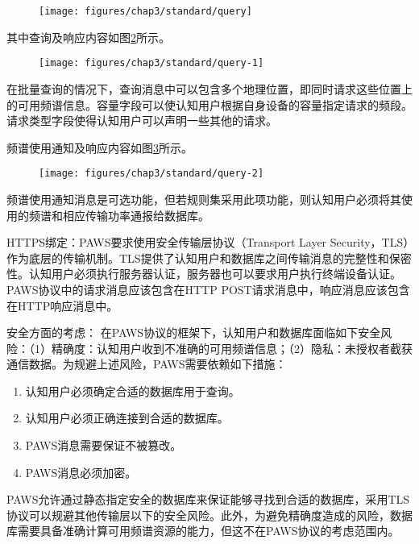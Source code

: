 \begin{enumerate}
\begin{figure}[!htp]\label{fig:query}
  \centering
  \texttt{[image: figures/chap3/standard/query]}
\end{figure}

其中查询及响应内容如图\ref{fig:query-1}所示。

\begin{figure}[!htp]\label{fig:query-1}
  \centering
  \texttt{[image: figures/chap3/standard/query-1]}
\end{figure}

在批量查询的情况下，查询消息中可以包含多个地理位置，即同时请求这些位置上的可用频谱信息。容量字段可以使认知用户根据自身设备的容量指定请求的频段。请求类型字段使得认知用户可以声明一些其他的请求。

频谱使用通知及响应内容如图\ref{fig:query-2}所示。

\begin{figure}[!htp]\label{fig:query-2}
  \centering
  \texttt{[image: figures/chap3/standard/query-2]}
\end{figure}

频谱使用通知消息是可选功能，但若规则集采用此项功能，则认知用户必须将其使用的频谱和相应传输功率通报给数据库。

\end{enumerate}



HTTPS绑定：PAWS要求使用安全传输层协议（Transport Layer Security，TLS）作为底层的传输机制。TLS提供了认知用户和数据库之间传输消息的完整性和保密性。认知用户必须执行服务器认证，服务器也可以要求用户执行终端设备认证。
PAWS协议中的请求消息应该包含在HTTP POST请求消息中，响应消息应该包含在HTTP响应消息中。



安全方面的考虑：
在PAWS协议的框架下，认知用户和数据库面临如下安全风险：（1）精确度：认知用户收到不准确的可用频谱信息；（2）隐私：未授权者截获通信数据。为规避上述风险，PAWS需要依赖如下措施：

\begin{enumerate}
\item 认知用户必须确定合适的数据库用于查询。
\item 认知用户必须正确连接到合适的数据库。
\item PAWS消息需要保证不被篡改。
\item PAWS消息必须加密。
\end{enumerate}

PAWS允许通过静态指定安全的数据库来保证能够寻找到合适的数据库，采用TLS协议可以规避其他传输层以下的安全风险。此外，为避免精确度造成的风险，数据库需要具备准确计算可用频谱资源的能力，但这不在PAWS协议的考虑范围内。


